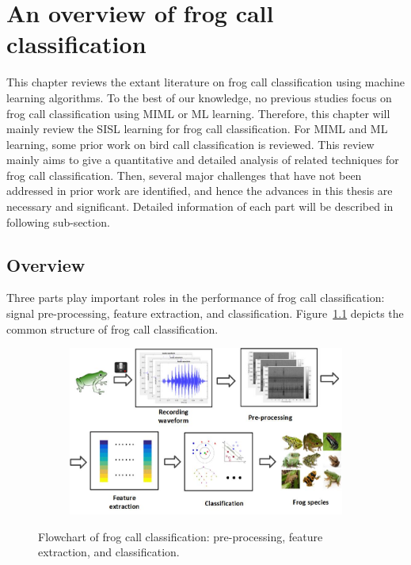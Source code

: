 
\chapter[Literature review]{An overview of frog call classification}
\label{cha:cha2LiteratureReview}

This chapter reviews the extant literature on frog call classification using machine learning algorithms. To the best of our knowledge, no previous studies focus on frog call classification using MIML or ML learning. Therefore, this chapter will mainly review the SISL learning for frog call classification. For MIML and ML learning, some prior work on bird call classification is reviewed. This review mainly aims to give a quantitative and detailed analysis of related techniques for frog call classification. 
Then, several major challenges that have not been addressed in prior work are identified, and hence the advances in this thesis are necessary and significant. Detailed information of each part will be described in following sub-section.

\section{Overview}
Three parts play important roles in the performance of frog call classification: signal pre-processing, feature extraction, and classification. Figure~\ref{ch2:fig:flowchart} depicts the common structure of frog call classification.

\begin{figure}[htb!]
\centering
    \begin{subfigure}[b]{\textwidth}
           \includegraphics[width=\textwidth]{image/Ch1/flowchart.jpg}
    \end{subfigure}%
\caption[Flowchart of frog call classification]{Flowchart of frog call classification: pre-processing, feature extraction, and classification.}
\label{ch2:fig:flowchart}       
\end{figure}


